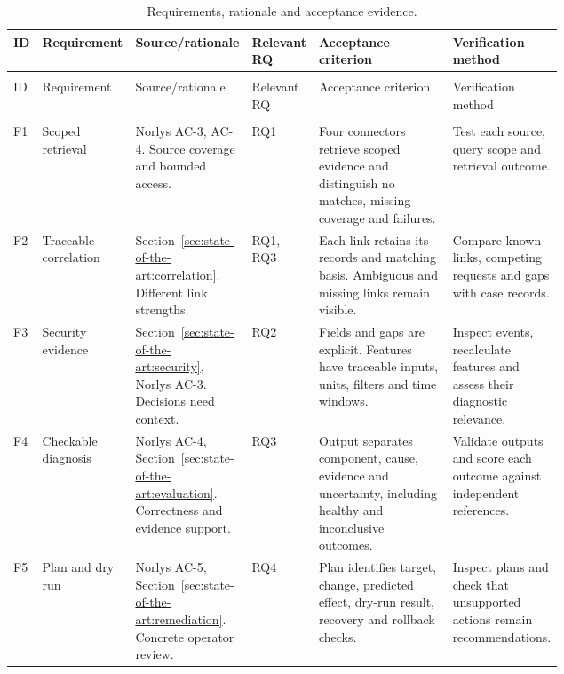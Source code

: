 \begin{landscape}
\begingroup
\fontsize{9.5}{11}\selectfont
\setlength{\tabcolsep}{4pt}
\renewcommand{\arraystretch}{1.0}
\begin{longtable}{@{}>{\raggedright\arraybackslash}p{0.045\linewidth}>{\raggedright\arraybackslash}p{0.14\linewidth}>{\raggedright\arraybackslash}p{0.19\linewidth}>{\raggedright\arraybackslash}p{0.065\linewidth}>{\raggedright\arraybackslash}p{0.28\linewidth}>{\raggedright\arraybackslash}p{}@{}}
\caption{Requirements, rationale and acceptance evidence.}
\label{tab:requirements:traceability}\\
\toprule
ID & Requirement & Source/rationale & Relevant RQ & Acceptance criterion & Verification method \\
\midrule
\endfirsthead
\multicolumn{6}{@{}l}{\tablename~\thetable\ continued}\\
\toprule
ID & Requirement & Source/rationale & Relevant RQ & Acceptance criterion & Verification method \\
\midrule
\endhead
\midrule
\multicolumn{6}{r@{}}{Continued on next page}\\
\endfoot
\bottomrule
\endlastfoot
F1 & Scoped retrieval & Norlys AC-3, AC-4. Source coverage and bounded access. & RQ1 & Four connectors retrieve scoped evidence and distinguish no matches, missing coverage and failures. & Test each source, query scope and retrieval outcome. \\
\addlinespace
F2 & Traceable correlation & Section~\ref{sec:state-of-the-art:correlation}. Different link strengths. & RQ1, RQ3 & Each link retains its records and matching basis. Ambiguous and missing links remain visible. & Compare known links, competing requests and gaps with case records. \\
\addlinespace
F3 & Security evidence & Section~\ref{sec:state-of-the-art:security}, Norlys AC-3. Decisions need context. & RQ2 & Fields and gaps are explicit. Features have traceable inputs, units, filters and time windows. & Inspect events, recalculate features and assess their diagnostic relevance. \\
\addlinespace
F4 & Checkable diagnosis & Norlys AC-4, Section~\ref{sec:state-of-the-art:evaluation}. Correctness and evidence support. & RQ3 & Output separates component, cause, evidence and uncertainty, including healthy and inconclusive outcomes. & Validate outputs and score each outcome against independent references. \\
\addlinespace
F5 & Plan and dry run & Norlys AC-5, Section~\ref{sec:state-of-the-art:remediation}. Concrete operator review. & RQ4 & Plan identifies target, change, predicted effect, dry-run result, recovery and rollback checks. & Inspect plans and check that unsupported actions remain recommendations. \\

\end{longtable}
\end{landscape}
